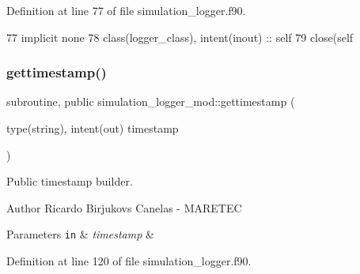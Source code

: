 Definition at line 77 of file simulation\+\_\+logger.\+f90.


\begin{DoxyCode}
77     \textcolor{keywordtype}{implicit none}
78     \textcolor{keywordtype}{class}(logger\_class), \textcolor{keywordtype}{intent(inout)} :: self            
79     \textcolor{keyword}{close}(self%
\end{DoxyCode}
\mbox{\label{namespacesimulation__logger__mod_a0326a5eeb649b041064a01d96aef0989}} 
\subsubsection{\texorpdfstring{gettimestamp()}{gettimestamp()}}
{\footnotesize\ttfamily subroutine, public simulation\+\_\+logger\+\_\+mod\+::gettimestamp (\begin{DoxyParamCaption}\item[{type(string), intent(out)}]{timestamp }\end{DoxyParamCaption})}



Public timestamp builder. 

\begin{DoxyAuthor}{Author}
Ricardo Birjukovs Canelas -\/ M\+A\+R\+E\+T\+EC
\end{DoxyAuthor}

\begin{DoxyParams}[1]{Parameters}
\mbox{\tt in}  & {\em timestamp} & \\
\hline
\end{DoxyParams}


Definition at line 120 of file simulation\+\_\+logger.\+f90.


